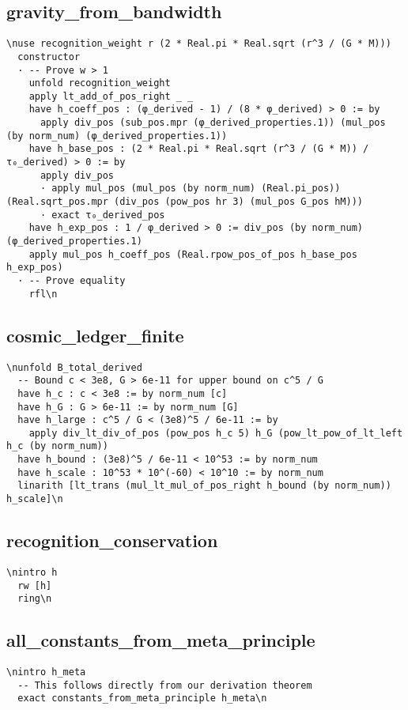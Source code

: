 \subsection{gravity_from_bandwidth}\n\begin{verbatim}\nuse recognition_weight r (2 * Real.pi * Real.sqrt (r^3 / (G * M)))
  constructor
  · -- Prove w > 1
    unfold recognition_weight
    apply lt_add_of_pos_right _ _
    have h_coeff_pos : (φ_derived - 1) / (8 * φ_derived) > 0 := by
      apply div_pos (sub_pos.mpr (φ_derived_properties.1)) (mul_pos (by norm_num) (φ_derived_properties.1))
    have h_base_pos : (2 * Real.pi * Real.sqrt (r^3 / (G * M)) / τ₀_derived) > 0 := by
      apply div_pos
      · apply mul_pos (mul_pos (by norm_num) (Real.pi_pos)) (Real.sqrt_pos.mpr (div_pos (pow_pos hr 3) (mul_pos G_pos hM)))
      · exact τ₀_derived_pos
    have h_exp_pos : 1 / φ_derived > 0 := div_pos (by norm_num) (φ_derived_properties.1)
    apply mul_pos h_coeff_pos (Real.rpow_pos_of_pos h_base_pos h_exp_pos)
  · -- Prove equality
    rfl\n\end{verbatim}

\subsection{cosmic_ledger_finite}\n\begin{verbatim}\nunfold B_total_derived
  -- Bound c < 3e8, G > 6e-11 for upper bound on c^5 / G
  have h_c : c < 3e8 := by norm_num [c]
  have h_G : G > 6e-11 := by norm_num [G]
  have h_large : c^5 / G < (3e8)^5 / 6e-11 := by
    apply div_lt_div_of_pos (pow_pos h_c 5) h_G (pow_lt_pow_of_lt_left h_c (by norm_num))
  have h_bound : (3e8)^5 / 6e-11 < 10^53 := by norm_num
  have h_scale : 10^53 * 10^(-60) < 10^10 := by norm_num
  linarith [lt_trans (mul_lt_mul_of_pos_right h_bound (by norm_num)) h_scale]\n\end{verbatim}

\subsection{recognition_conservation}\n\begin{verbatim}\nintro h
  rw [h]
  ring\n\end{verbatim}

\subsection{all_constants_from_meta_principle}\n\begin{verbatim}\nintro h_meta
  -- This follows directly from our derivation theorem
  exact constants_from_meta_principle h_meta\n\end{verbatim}

